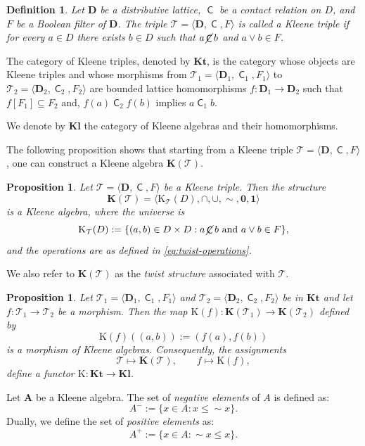 \documentclass[10pt,a4paper]{amsart}
\newtheorem{proposition}[theorem]{Proposition}
\newtheorem{definition}[theorem]{Definition}
\DeclareMathOperator{\con}{\mathsf{C}}
\DeclareMathOperator{\notcon}{\cancel{ \con}}
\newcommand{\KC}[1]{\mathrm{K}_\T(#1)}
\newcommand{\one}{\mathbf{1}}
\newcommand{\zero}{\mathbf{0}}
\newcommand{\A}{\mathbf{A}}
\newcommand{\D}{\mathbf{D}}
\newcommand{\T}{\mathcal{T}}
\begin{document}
\begin{definition}
    Let $ \D$ be a distributive lattice, $ \con$ be a contact relation on $D$, and $ F$ be a Boolean filter of $ \D$. The triple $ \T=\langle \D, \con, F \rangle$ is called a \emph{Kleene triple} if for every $ a \in D$ there exists $ b \in D$ such that $ a\notcon b$ and $ a \vee b \in F$.
\end{definition}

The category of Kleene triples, denoted by $ \mathbf{Kt}$, is the category whose objects are Kleene triples and whose morphisms from
$\T_1=\langle\D_1,\con_1,F_1\rangle$ to $\T_2=\langle\D_2,\con_2,F_2\rangle$ are bounded lattice homomorphisms $f\colon \D_1\to \D_2$ such that $ f[F_1] \subseteq F_2$ and, $f(a)\con_2 f(b)$ implies $a\con_1 b$.

We denote by $\mathbf{Kl}$ the category of Kleene algebras and their homomorphisms.

The following proposition shows that starting from a Kleene triple $\T = \langle \D, \con, F \rangle$, one can construct a Kleene algebra $\mathbf{K}(\T)$.

\begin{proposition}
\label{prop:twist-kleene}
Let $\T = \langle \D, \con, F \rangle$ be a Kleene triple. Then the structure
\[
\mathbf{K}(\T) = \langle \KC{D}, \cap, \cup, \sim, \zero, \one \rangle
\]
is a Kleene algebra, where the universe is
\[
\KC{D} := \{ (a, b) \in D \times D : a\notcon b \text{ and } a \vee b \in F \},
\]
and the operations are as defined in \ref{eq:twist-operations}.
\end{proposition}

We also refer to $\mathbf{K}(\T)$ as the \emph{twist structure} associated with $\T$.

\begin{proposition}
\label{prop:Kfunctor-mor}
Let $\T_1=\langle \D_1,\con_1,F_1\rangle$ and $\T_2=\langle \D_2,\con_2,F_2\rangle$ be in $ \mathbf{Kt}$ and let $f \colon \T_1 \to  \T_2$ be a morphism. Then the map $\mathrm{K}(f) \colon \mathbf{K}(\T_1) \to \mathbf{K}(\T_2)$ defined by
\[
    \mathrm{K}(f)((a, b)) := (f(a), f(b))
\]
is a morphism of Kleene algebras. Consequently, the assignments
\[
\T\mapsto\mathbf{K}(\T),
\qquad
f\mapsto\mathrm{K}(f),
\]
define a functor $\mathrm{K}:\mathbf{Kt}\to\mathbf{Kl}$. 
\end{proposition}

Let $\A$ be a Kleene algebra. The set of \emph{negative elements} of $A$ is defined as:
\[
A^{-}:= \{ x \in A : x \leq \sim x \}.
\]
Dually, we define the set of \emph{positive elements} as:
\[
A^{+}  := \{ x \in A : \sim x \leq x \}.
\]
\end{document}
